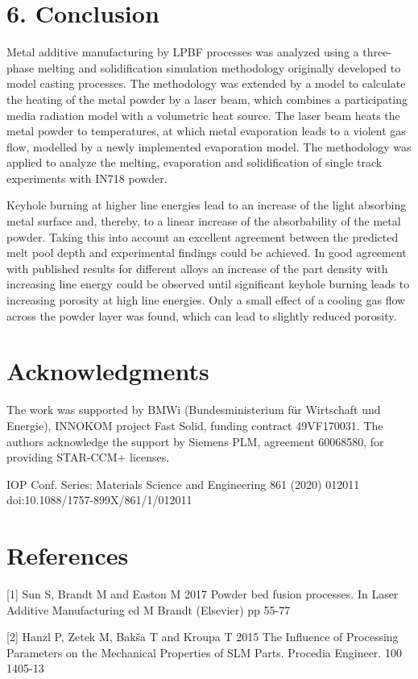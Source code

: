 \documentclass[10pt]{article}
\begin{document}
\section*{6. Conclusion}
Metal additive manufacturing by LPBF processes was analyzed using a three-phase melting and solidification simulation methodology originally developed to model casting processes. The methodology was extended by a model to calculate the heating of the metal powder by a laser beam, which combines a participating media radiation model with a volumetric heat source. The laser beam heats the metal powder to temperatures, at which metal evaporation leads to a violent gas flow, modelled by a newly implemented evaporation model. The methodology was applied to analyze the melting, evaporation and solidification of single track experiments with IN718 powder.

Keyhole burning at higher line energies lead to an increase of the light absorbing metal surface and, thereby, to a linear increase of the absorbability of the metal powder. Taking this into account an excellent agreement between the predicted melt pool depth and experimental findings could be achieved. In good agreement with published results for different alloys an increase of the part density with increasing line energy could be observed until significant keyhole burning leads to increasing porosity at high line energies. Only a small effect of a cooling gas flow across the powder layer was found, which can lead to slightly reduced porosity.

\section*{Acknowledgments}
The work was supported by BMWi (Bundesministerium für Wirtschaft und Energie), INNOKOM project Fast Solid, funding contract 49VF170031. The authors acknowledge the support by Siemens PLM, agreement 60068580, for providing STAR-CCM+ licenses.

IOP Conf. Series: Materials Science and Engineering 861 (2020) 012011 doi:10.1088/1757-899X/861/1/012011

\section*{References}
[1] Sun S, Brandt M and Easton M 2017 Powder bed fusion processes. In Laser Additive Manufacturing ed M Brandt (Elsevier) pp 55-77

[2] Hanzl P, Zetek M, Bakša T and Kroupa T 2015 The Influence of Processing Parameters on the Mechanical Properties of SLM Parts. Procedia Engineer. 100 1405-13
\end{document}
